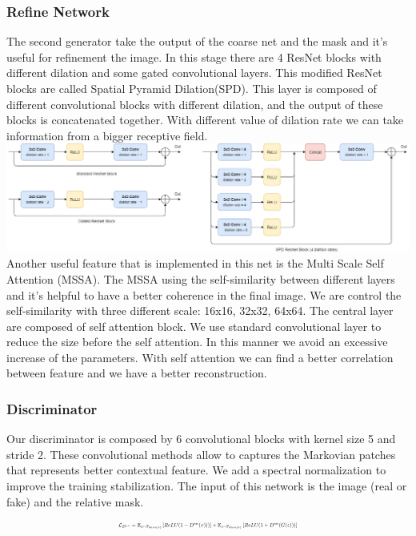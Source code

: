 \documentclass[10pt,twocolumn,letterpaper]{article}
\begin{document}
\subsubsection{Refine Network}
The second generator take the output of the coarse net and the mask and it's useful for refinement the image.
In this stage there are 4 ResNet blocks with different dilation and some gated convolutional layers.
This modified ResNet blocks are called Spatial Pyramid Dilation(SPD). This layer is composed of different convolutional blocks with different dilation, and the output of these blocks is concatenated together. With different value of dilation rate we can take information from a bigger receptive field.
\includegraphics[width=1\linewidth]{img/ResNetSPD.png}
Another useful feature that is implemented in this net is the Multi Scale Self Attention (MSSA). The MSSA using the self-similarity between different layers and it's helpful to have a better coherence in the final image. We are control the self-similarity with three different scale: 16x16, 32x32, 64x64.
The central layer are composed of self attention block. We use standard convolutional layer to reduce the size before the self attention. In this manner we avoid an excessive increase of the parameters. With self attention we can find a better correlation between feature and we have a better reconstruction.
\subsubsection{Discriminator}
Our discriminator is composed by 6 convolutional blocks with kernel size 5 and stride 2.
These convolutional methods allow to captures the Markovian patches that represents better contextual feature\cite{li2016precomputed}.
We add a spectral normalization to improve the training stabilization\cite{miyato2018spectral}.
The input of this network is the image (real or fake) and the relative mask. 
\begin{equation}
    \resizebox{.47 \textwidth}{!}{%
        $\mathcal{L}_{D^{sn}}= \mathbb{E}_{x\sim \mathbb{P}_{data(x)}} \left [ ReLU(1-D^{sn}(x))) \right ] + \mathbb{E}_{z\sim \mathbb{P}_{data(x)}} \left [ ReLU(1+D^{sn}(G(z)))\right ]$%
}
\end{equation}
\end{document}
